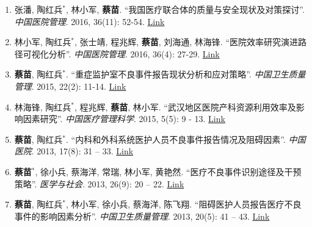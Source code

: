 \documentclass[11pt, a4paper]{article}
\newcommand{\years}[1]{\marginnote{\scriptsize #1}}
\begin{document}
\begin{enumerate}[leftmargin=0ex,itemsep=1ex]
		\item 张潘, 陶红兵$^\ast$, 林小军, \textbf{蔡苗}. “我国医疗联合体的质量与安全现状及对策探讨”. \emph{中国医院管理}. 2016, 36(11): 52-54. \href{http://www.cnki.com.cn/Article/CJFDTOTAL-YYGL201611027.htm}{Link}
		
		\item 林小军, 陶红兵$^\ast$, 张士靖, 程兆辉, \textbf{蔡苗}, 刘海通, 林海锋. “医院效率研究演进路径可视化分析”. \emph{中国医院管理}. 2016, 36(4): 27-29. \href{http://www.cnki.com.cn/Article/CJFDTOTAL-YYGL201604015.htm}{Link}
		
		\item \years{2015}\textcolor{RubineRed}{\textbf{蔡苗}}, 陶红兵$^\ast$. “重症监护室不良事件报告现状分析和应对策略”. \emph{中国卫生质量管理}. 2015, 22(2): 11-14. \href{http://www.cnki.com.cn/Article/CJFDTOTAL-WSJG201502008.htm}{Link}
		
		\item 林海锋, 陶红兵$^\ast$, 程兆辉, \textbf{蔡苗}, 林小军. “武汉地区医院产科资源利用效率及影响因素研究”. \emph{中国医疗管理科学}. 2015, 5(5): 9 - 13. \href{http://www.cnki.com.cn/Article/CJFDTOTAL-YLGL201505004.htm}{Link}
		
		\item \years{2013}\textcolor{RubineRed}{\textbf{蔡苗}}, 陶红兵$^\ast$. “内科和外科系统医护人员不良事件报告情况及阻碍因素”. \emph{中国医院}. 2013, 17(8): 31 – 33. \href{http://www.cnki.com.cn/Article/CJFDTOTAL-ZGYU201308016.htm}{Link}
		
		\item \textcolor{RubineRed}{\textbf{蔡苗}}$^\ast$,  徐小兵, 蔡海洋, 常瑞, 林小军, 黄艳然. “医疗不良事件识别途径及干预策略”. \emph{医学与社会}. 2013, 26(9): 20 – 22. \href{http://www.cnki.com.cn/Article/CJFDTOTAL-YXSH201309007.htm}{Link}
		
		\item \textcolor{RubineRed}{\textbf{蔡苗}}, 陶红兵$^\ast$, 林小军, 徐小兵, 蔡海洋, 陈飞翔. “阻碍医护人员报告医疗不良事件的影响因素分析”. \emph{中国卫生质量管理}. 2013, 20(5): 41 – 43. \href{http://www.cqvip.com/qk/98273x/201305/47221843.html}{Link}
	\end{enumerate}
	
	
\end{document}
